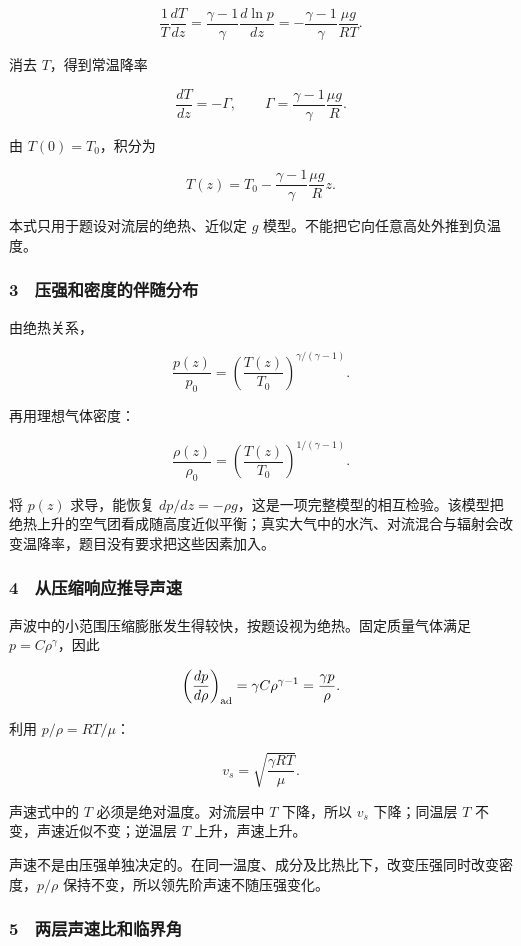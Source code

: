 \documentclass[12pt,a4paper,fontset=fandol]{ctexart}
\begin{document}
\[\frac1T\frac{dT}{dz}
=\frac{\gamma-1}{\gamma}\frac{d\ln p}{dz}
=-\frac{\gamma-1}{\gamma}\frac{\mu g}{RT}.\]

消去 \(T\)，得到常温降率

\[\boxed{\frac{dT}{dz}=-\Gamma,\qquad
\Gamma=\frac{\gamma-1}{\gamma}\frac{\mu g}{R}.}\]

由 \(T(0)=T_0\)，积分为

\[\boxed{T(z)=T_0-\frac{\gamma-1}{\gamma}\frac{\mu g}{R}z.}\]

本式只用于题设对流层的绝热、近似定 \(g\)
模型。不能把它向任意高处外推到负温度。

\subsubsection{3　压强和密度的伴随分布}\label{ux538bux5f3aux548cux5bc6ux5ea6ux7684ux4f34ux968fux5206ux5e03}

由绝热关系，

\[\frac{p(z)}{p_0}=
\left(\frac{T(z)}{T_0}\right)^{\gamma/(\gamma-1)}.\]

再用理想气体密度：

\[\frac{\rho(z)}{\rho_0}=
\left(\frac{T(z)}{T_0}\right)^{1/(\gamma-1)}.\]

将 \(p(z)\) 求导，能恢复
\(dp/dz=-\rho g\)，这是一项完整模型的相互检验。该模型把绝热上升的空气团看成随高度近似平衡；真实大气中的水汽、对流混合与辐射会改变温降率，题目没有要求把这些因素加入。

\subsubsection{4　从压缩响应推导声速}\label{ux4eceux538bux7f29ux54cdux5e94ux63a8ux5bfcux58f0ux901f}

声波中的小范围压缩膨胀发生得较快，按题设视为绝热。固定质量气体满足
\(p=C\rho^\gamma\)，因此

\[\left(\frac{dp}{d\rho}\right)_{\rm ad}
=\gamma C\rho^{\gamma-1}=\frac{\gamma p}{\rho}.\]

利用 \(p/\rho=RT/\mu\)：

\[\boxed{v_s=\sqrt{\frac{\gamma RT}{\mu}}.}\]

声速式中的 \(T\) 必须是绝对温度。对流层中 \(T\) 下降，所以 \(v_s\)
下降；同温层 \(T\) 不变，声速近似不变；逆温层 \(T\) 上升，声速上升。

声速不是由压强单独决定的。在同一温度、成分及比热比下，改变压强同时改变密度，\(p/\rho\)
保持不变，所以领先阶声速不随压强变化。

\subsubsection{5　两层声速比和临界角}\label{ux4e24ux5c42ux58f0ux901fux6bd4ux548cux4e34ux754cux89d2}
\end{document}
